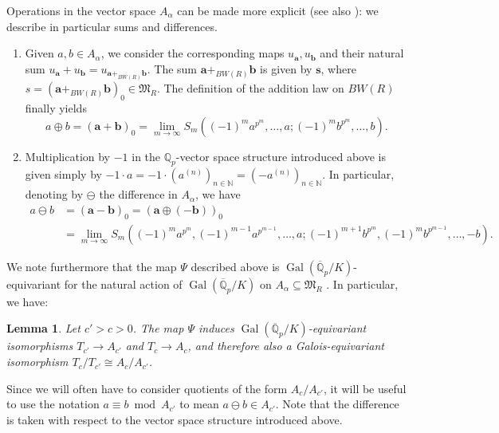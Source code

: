 \documentclass{amsart}
\newtheorem{lemma}[theorem]{Lemma}
\theoremstyle{definition}
\numberwithin{theorem}{section}
\numberwithin{equation}{section}
\begin{document}
Operations in the vector space $A_\alpha$ can be made more explicit (see also \cite[p.~126]{Volkov}): we describe in particular sums and differences.
\begin{enumerate}
    \item Given $a, b \in A_{\alpha}$, we consider the corresponding maps $u_{\mathbf{a}}, u_{\mathbf{b}}$ and their natural sum $u_{\mathbf{a}} + u_{\mathbf{b}} = u_{\mathbf{a} +_{BW(R)} \mathbf{b}}$. The sum $\mathbf{a} +_{BW(R)} \mathbf{b}$ is given by $\mathbf{s}$, where $s = (\mathbf{a} +_{BW(R)} \mathbf{b})_0 \in \mathfrak{M}_R$. The definition of the addition law on $BW(R)$ finally yields
    \[
    a \oplus b = (\mathbf{a} + \mathbf{b})_0 = \lim_{m \to \infty} S_m( (-1)^m a^{p^m}, \ldots, a; (-1)^m b^{p^m}, \ldots, b).
    \]
\item Multiplication by $-1$ in the $\mathbb{Q}_p$-vector space structure introduced above is given simply by $-1 \cdot a = -1 \cdot (a^{(n)})_{n \in \mathbb{N}} = (-a^{(n)})_{n \in \mathbb{N}}$. In particular, denoting by $\ominus$ the difference in $A_{\alpha}$, we have
\begin{equation}\label{eq: subtraction Ac}
\begin{aligned}
a \ominus b & = (\mathbf{a} - \mathbf{b})_0 = (\mathbf{a} \oplus (-\mathbf{b}))_0 \\
& = \lim_{m \to \infty} S_m( (-1)^m a^{p^m}, (-1)^{m-1} a^{p^{m-1}}, \ldots, a; (-1)^{m+1} b^{p^m}, (-1)^{m} b^{p^{m-1}}, \ldots, -b).
\end{aligned}
\end{equation}
\end{enumerate}
We note furthermore that the map $\Psi$ described above is $\operatorname{Gal}(\overline{\mathbb{Q}}_p/K)$-equivariant  for the natural action of $\operatorname{Gal}(\overline{\mathbb{Q}}_p/K)$ on $A_\alpha \subseteq \mathfrak{M}_R$ \cite[p.~126]{Volkov}. In particular, we have:

\begin{lemma}\label{lemma: Tc or Ac ça m'est égal}
    Let $c' > c >0$. The map $\Psi$ induces $\operatorname{Gal}(\overline{\mathbb{Q}}_p/K)$-equivariant isomorphisms $T_{c'} \to A_{c'}$ and $T_c \to A_c$, and therefore also a Galois-equivariant isomorphism $T_c/T_{c'} \cong A_c/A_{c'}$.
\end{lemma}

    
Since we will often have to consider quotients of the form $A_c/A_{c'}$, it will be useful to use the notation $a \equiv b \bmod{A_{c'}}$ to mean $a \ominus b \in A_{c'}$. Note that the difference is taken with respect to the vector space structure introduced above.
\end{document}
